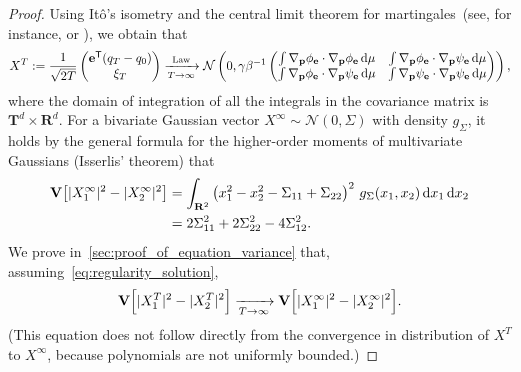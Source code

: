 \documentclass[11pt,a4paper]{article}
\newcommand{\var}[0]{\mathbf{V}}
\newcommand{\real}{\mathbf R}
\newcommand{\torus}{\mathbf T}
\newcommand{\grad}{\nabla}
\newcommand{\vect}[1]{\boldsymbol{\mathbf #1}}
\renewcommand{\d}{\mathrm d}
\renewcommand{\t}{\mathsf T}
\theoremstyle{plain}
\numberwithin{equation}{section}
\begin{document}
\begin{proof}
    Using It\^o's isometry and the central limit theorem for martingales~(see, for instance, \cite{MR668684} or \cite[Theorem 3.3]{pavliotis2008multiscale}),
    we obtain that
    \[
        X^T :=
        \frac{1}{\sqrt{2T}}
        \begin{pmatrix}
            \vect e^\t (q_T - q_0) \\
            \xi_T
        \end{pmatrix}
        \xrightarrow[T \to \infty]{\rm Law}
        \mathcal N \left(0,
            \gamma \beta^{-1}
            \begin{pmatrix}
                \int \grad_{\vect p} \phi_{\vect e} \cdot \grad_{\vect p} \phi_{\vect e} \, \d \mu & \int \grad_{\vect p} \phi_{\vect e} \cdot \grad_{\vect p} \psi_{\vect e} \, \d \mu \\
                \int \grad_{\vect p} \phi_{\vect e} \cdot \grad_{\vect p} \psi_{\vect e} \, \d \mu & \int \grad_{\vect p} \psi_{\vect e} \cdot \grad_{\vect p} \psi_{\vect e} \, \d \mu
            \end{pmatrix}
        \right),
    \]
    where the domain of integration of all the integrals in the covariance matrix is $\torus^d \times \real^d$.
    For a bivariate Gaussian vector $X^{\infty} \sim \mathcal N(0, \Sigma)$ with density $g_{\Sigma}$,
    it holds by the general formula for the higher-order moments of multivariate Gaussians (Isserlis' theorem)
    that
    \begin{align}
        \notag
        \var \bigl[ \lvert X^{\infty}_1 \rvert^2 - \lvert X^{\infty}_2 \rvert^2\bigr]
        &= \int_{\real^2} \left( x_1^2 - x_2^2 - \Sigma_{11} + \Sigma_{22} \right)^2 \, g_{\Sigma}(x_1, x_2) \, \d x_1 \, \d x_2 \\
        \label{eq:intermediate_identity}
        &= 2 \Sigma_{11}^2 + 2 \Sigma_{22}^2 - 4 \Sigma_{12}^2.
    \end{align}
    We prove in~\cref{sec:proof_of_equation_variance} that,
    assuming~\eqref{eq:regularity_solution},
    \begin{equation}
        \label{eq:limit_variance}
        \var \Bigl[ \lvert X^T_1 \rvert^2 - \lvert X^T_2 \rvert^2 \Bigr]
        \xrightarrow[T \to \infty]{}
        \var \Bigl[ \lvert X^{\infty}_1 \rvert^2 - \lvert X^{\infty}_2 \rvert^2 \Bigr].
    \end{equation}
    (This equation does not follow directly from the convergence in distribution of $X^T$ to $X^{\infty}$,
    because polynomials are not uniformly bounded.)

\end{proof}
\end{document}
